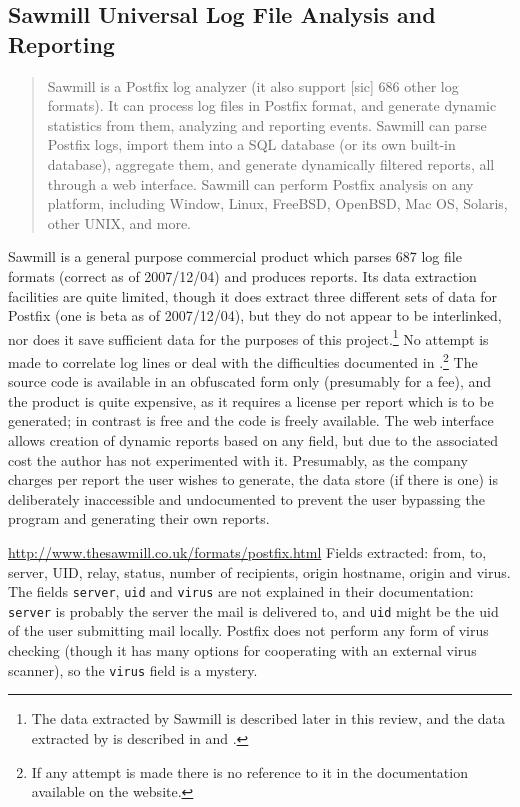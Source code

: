 \subsection{Sawmill Universal Log File Analysis and Reporting}

\begin{quotation}

    Sawmill is a Postfix log analyzer (it also support [sic] 686 other log
    formats).  It can process log files in Postfix format, and generate
    dynamic statistics from them, analyzing and reporting events.  Sawmill
    can parse Postfix logs, import them into a SQL database (or its own
    built-in database), aggregate them, and generate dynamically filtered
    reports, all through a web interface.  Sawmill can perform Postfix
    analysis on any platform, including Window, Linux, FreeBSD, OpenBSD,
    Mac OS, Solaris, other UNIX, and more.

\end{quotation}

Sawmill is a general purpose commercial product which parses 687 log file
formats (correct as of 2007/12/04) and produces reports.  Its data
extraction facilities are quite limited, though it does extract three
different sets of data for Postfix (one is beta as of 2007/12/04), but they
do not appear to be interlinked, nor does it save sufficient data for the
purposes of this project.\footnote{The data extracted by Sawmill is
described later in this review, and the data extracted by \PLP{} is
described in  and .}  No attempt is made to correlate log lines or deal with the
difficulties documented in 
.\footnote{If any attempt is made
there is no reference to it in the documentation available on the website.}
The source code is available in an obfuscated form only (presumably for a
fee), and the product is quite expensive, as it requires a license per
report which is to be generated; in contrast \parsername{} is free and the
code is freely available.  The web interface allows creation of dynamic
reports based on any field, but due to the associated cost the author has
not experimented with it.  Presumably, as the company charges per report
the user wishes to generate, the data store (if there is one) is
deliberately inaccessible and undocumented to prevent the user bypassing
the program and generating their own reports.

\url{http://www.thesawmill.co.uk/formats/postfix.html} \newline Fields
extracted: from, to, server, UID, relay, status, number of recipients,
origin hostname, origin \IP{} and virus.  The fields \texttt{server},
\texttt{uid} and \texttt{virus} are not explained in their documentation:
\texttt{server} is probably the server the mail is delivered to, and
\texttt{uid} might be the uid of the user submitting mail locally.  Postfix
does not perform any form of virus checking (though it has many options for
cooperating with an external virus scanner), so the \texttt{virus} field is
a mystery.

